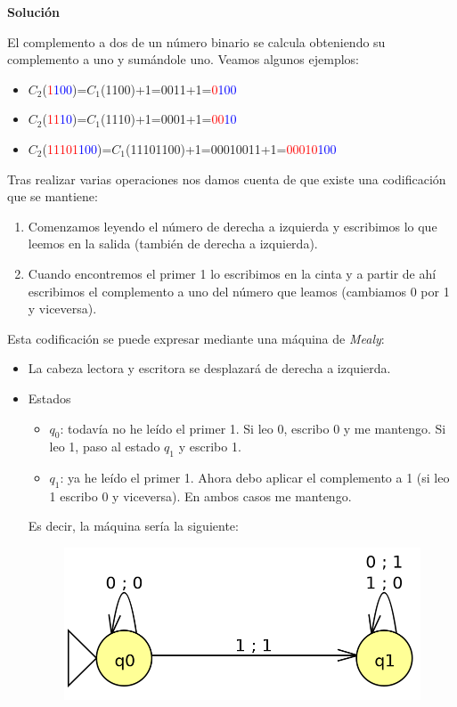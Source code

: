 \documentclass[12pt,spanish]{article}
\newenvironment{solution}{
	\par
	\textbf{Solución}
	\par
	\begin{center}
}
{
	\end{center}
}
\begin{document}
\begin{enumerate}
	\begin{solution}
	El complemento a dos de un número binario se calcula obteniendo su complemento a uno y sumándole uno. Veamos algunos ejemplos:
	\begin{itemize}
		\item $C_2$(\textcolor{red}{1}\textcolor{blue}{100})=$C_1$(1100)+1=0011+1=\textcolor{red}{0}\textcolor{blue}{100}
		\item $C_2$(\textcolor{red}{11}\textcolor{blue}{10})=$C_1$(1110)+1=0001+1=\textcolor{red}{00}\textcolor{blue}{10}
		\item $C_2$(\textcolor{red}{11101}\textcolor{blue}{100})=$C_1$(11101100)+1=00010011+1=\textcolor{red}{00010}\textcolor{blue}{100}
	\end{itemize}
	Tras realizar varias operaciones nos damos cuenta de que existe una codificación que se mantiene:
	\begin{enumerate}
		\item Comenzamos leyendo el número de derecha a izquierda y escribimos lo que leemos en la salida (también de derecha a izquierda).
		\item Cuando encontremos el primer 1 lo escribimos en la cinta y a partir de ahí escribimos el complemento a uno del número que leamos (cambiamos 0 por 1 y viceversa).
	\end{enumerate}
	\newpage
	Esta codificación se puede expresar mediante una máquina de \textit{Mealy}:
	\begin{itemize}
		\item La cabeza lectora y escritora se desplazará de derecha a izquierda.
		\item Estados
			\begin{itemize}
				\item $q_0$: todavía no he leído el primer 1. Si leo 0, escribo 0 y me mantengo. Si leo 1, paso al estado $q_1$ y escribo 1.
				\item $q_1$: ya he leído el primer 1. Ahora debo aplicar el complemento a 1 (si leo 1 escribo 0 y viceversa). En ambos casos me mantengo.
			\end{itemize}
		Es decir, la máquina sería la siguiente:
			\begin{figure}[H]
				\centering
				\includegraphics{ej2.png}
			\end{figure}
	\end{itemize}


\end{solution}
\end{enumerate}
\end{document}
